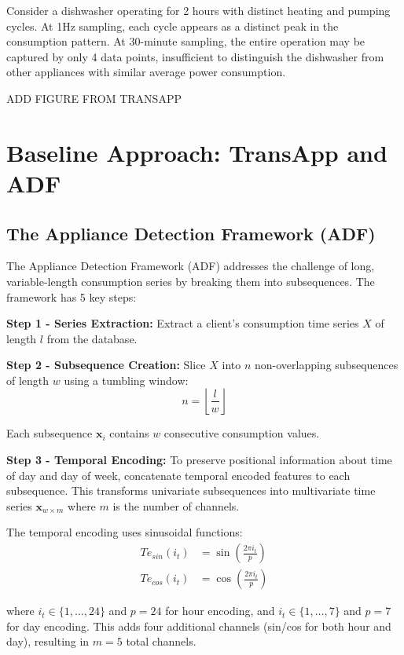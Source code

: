 \documentclass[conference]{IEEEtran}
\begin{document}
Consider a dishwasher operating for 2 hours with distinct heating and pumping cycles. At 1Hz sampling, each cycle appears as a distinct peak in the consumption pattern. At 30-minute sampling, the entire operation may be captured by only 4 data points, insufficient to distinguish the dishwasher from other appliances with similar average power consumption.

ADD FIGURE FROM TRANSAPP
\section{Baseline Approach: TransApp and ADF}
\label{sec:baseline}

\subsection{The Appliance Detection Framework (ADF)}

The Appliance Detection Framework (ADF) addresses the challenge of long, variable-length consumption series by breaking them into subsequences. The framework has 5 key steps:

\textbf{Step 1 - Series Extraction:} Extract a client's consumption time series $X$ of length $l$ from the database.

\textbf{Step 2 - Subsequence Creation:} Slice $X$ into $n$ non-overlapping subsequences of length $w$ using a tumbling window:
\begin{equation}
n = \left\lfloor \frac{l}{w} \right\rfloor
\end{equation}

Each subsequence $\mathbf{x}_i$ contains $w$ consecutive consumption values.

\textbf{Step 3 - Temporal Encoding:} To preserve positional information about time of day and day of week, concatenate temporal encoded features to each subsequence. This transforms univariate subsequences into multivariate time series $\mathbf{x}_{w \times m}$ where $m$ is the number of channels.

The temporal encoding uses sinusoidal functions:
\begin{align}
Te_{sin}(i_t) &= \sin\left(\frac{2\pi i_t}{p}\right) \\
Te_{cos}(i_t) &= \cos\left(\frac{2\pi i_t}{p}\right)
\end{align}

where $i_t \in \{1, \ldots, 24\}$ and $p = 24$ for hour encoding, and $i_t \in \{1, \ldots, 7\}$ and $p = 7$ for day encoding. This adds four additional channels (sin/cos for both hour and day), resulting in $m = 5$ total channels.
\end{document}
